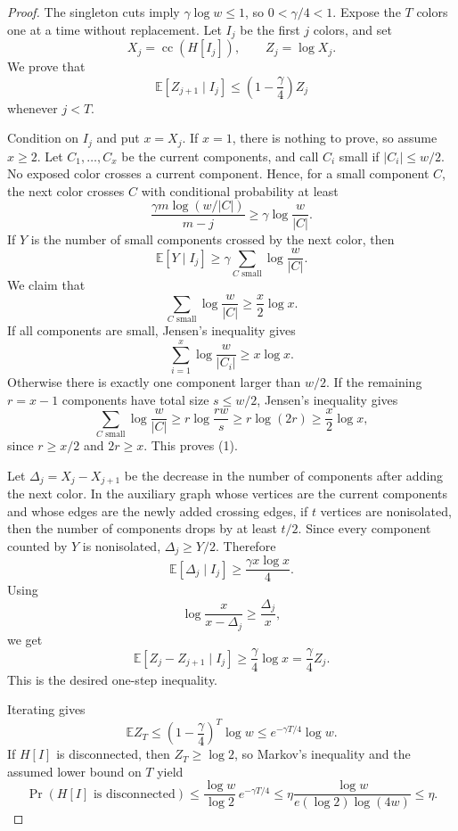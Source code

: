 \documentclass{amsart}
\theoremstyle{definition}
\theoremstyle{remark}
\DeclareMathOperator{\cc}{cc}
\begin{document}
\begin{proof}
The singleton cuts imply \(\gamma\log w\le1\), so \(0<\gamma/4<1\). Expose the \(T\) colors one at a time without replacement. Let \(I_j\) be the first \(j\) colors, and set
\[
X_j=\cc(H[I_j]),\qquad Z_j=\log X_j.
\]
We prove that
\[
\mathbb E[Z_{j+1}\mid I_j]\le \left(1-\frac\gamma4\right)Z_j
\]
whenever \(j<T\).

Condition on \(I_j\) and put \(x=X_j\). If \(x=1\), there is nothing to prove, so assume \(x\ge2\). Let \(C_1,\ldots,C_x\) be the current components, and call \(C_i\) small if \(|C_i|\le w/2\). No exposed color crosses a current component. Hence, for a small component \(C\), the next color crosses \(C\) with conditional probability at least
\[
\frac{\gamma m\log(w/|C|)}{m-j}\ge \gamma\log\frac{w}{|C|}.
\]
If \(Y\) is the number of small components crossed by the next color, then
\[
\mathbb E[Y\mid I_j]\ge \gamma\sum_{C\text{ small}}\log\frac{w}{|C|}.
\]
We claim that
\[
\sum_{C\text{ small}}\log\frac{w}{|C|}\ge \frac{x}{2}\log x. \tag{1}
\]
If all components are small, Jensen's inequality gives
\[
\sum_{i=1}^x\log\frac{w}{|C_i|}\ge x\log x.
\]
Otherwise there is exactly one component larger than \(w/2\). If the remaining \(r=x-1\) components have total size \(s\le w/2\), Jensen's inequality gives
\[
\sum_{C\text{ small}}\log\frac{w}{|C|}
\ge r\log\frac{rw}{s}
\ge r\log(2r)
\ge \frac{x}{2}\log x,
\]
since \(r\ge x/2\) and \(2r\ge x\). This proves (1).

Let \(\Delta_j=X_j-X_{j+1}\) be the decrease in the number of components after adding the next color. In the auxiliary graph whose vertices are the current components and whose edges are the newly added crossing edges, if \(t\) vertices are nonisolated, then the number of components drops by at least \(t/2\). Since every component counted by \(Y\) is nonisolated, \(\Delta_j\ge Y/2\). Therefore
\[
\mathbb E[\Delta_j\mid I_j]
\ge \frac{\gamma x\log x}{4}.
\]
Using
\[
\log\frac{x}{x-\Delta_j}\ge \frac{\Delta_j}{x},
\]
we get
\[
\mathbb E[Z_j-Z_{j+1}\mid I_j]
\ge \frac{\gamma}{4}\log x
=\frac\gamma4 Z_j.
\]
This is the desired one-step inequality.

Iterating gives
\[
\mathbb E Z_T
\le \left(1-\frac\gamma4\right)^T\log w
\le e^{-\gamma T/4}\log w.
\]
If \(H[I]\) is disconnected, then \(Z_T\ge\log2\), so Markov's inequality and the assumed lower bound on \(T\) yield
\[
\Pr(H[I]\text{ is disconnected})
\le \frac{\log w}{\log2}\,e^{-\gamma T/4}
\le \eta\frac{\log w}{e(\log2)\log(4w)}
\le \eta.
\]
\end{proof}
\end{document}
